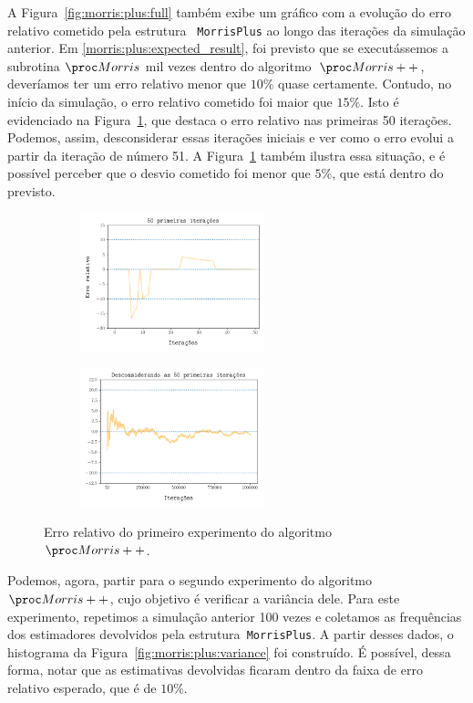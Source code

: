 A Figura~\ref{fig:morris:plus:full} também exibe um gráfico com a evolução do erro relativo cometido pela estrutura
~\texttt{MorrisPlus} ao longo das iterações da simulação anterior. Em \eqref{morris:plus:expected_result}, foi previsto
que se executássemos a subrotina $\Morris$ mil vezes dentro do algoritmo~$\Morrispp$, deveríamos ter um erro relativo
menor que $10\%$ quase certamente. Contudo, no início da simulação, o erro relativo cometido foi maior que $15\%$. Isto 
é evidenciado na Figura~\ref{fig:morris:plus:error}, que destaca o erro relativo nas primeiras 50 iterações. 
Podemos, assim, desconsiderar essas iterações iniciais e ver como o erro evolui a partir da iteração de número 51. A 
Figura~\ref{fig:morris:plus:error} também ilustra essa situação, e é possível perceber que o desvio cometido foi menor
que $5\%$, que está dentro do previsto.

\begin{figure}
  \centering
  \begin{subfigure}{.5\textwidth}
    \centering
    \includegraphics[height=4cm, width=\linewidth]{figuras/morris_plus_erro_first.png}
  \end{subfigure}%
  \begin{subfigure}{.5\textwidth}
    \centering
    \captionsetup{justification=centering}
    \includegraphics[height=4cm, width=\textwidth]{figuras/morris_plus_erro_sem_first.png}
  \end{subfigure}
  \caption{Erro relativo do primeiro experimento do algoritmo~$\Morrispp$.}
  \label{fig:morris:plus:error}
\end{figure}

Podemos, agora, partir para o segundo experimento do algoritmo~$\Morrispp$, cujo objetivo é verificar a variância dele.
Para este experimento, repetimos a simulação anterior 100 vezes e coletamos as frequências dos estimadores devolvidos
pela estrutura~\texttt{MorrisPlus}. A partir desses dados, o histograma da Figura~\ref{fig:morris:plus:variance} foi 
construído. É possível, dessa forma, notar que as estimativas devolvidas ficaram dentro da faixa de erro relativo 
esperado, que é de $10\%$.

